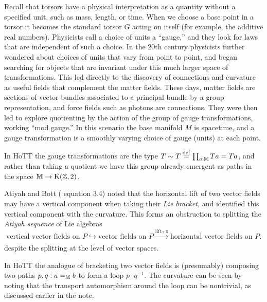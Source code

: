 \begin{mynote}
Recall that torsors have a physical interpretation as a quantity without a specified unit, such as mass, length, or time. When we choose a base point in a torsor it becomes the standard torsor \( G \) acting on itself (for example, the additive real numbers). Physicists call a choice of units a ``gauge,'' and they look for laws that are independent of such a choice. In the 20th century physicists further wondered about choices of units that vary from point to point, and began searching for objects that are invariant under this much larger space of transformations. This led directly to the discovery of connections and curvature as useful fields that complement the matter fields. These days, matter fields are sections of vector bundles associated to a principal bundle by a group representation, and force fields such as photons are connections. They were then led to explore quotienting by the action of the group of gauge transformations, working ``mod gauge.'' In this scenario the base manifold \( M \) is spacetime, and a gauge transformation is a smoothly varying choice of gauge (units) at each point.
\end{mynote}

In HoTT the gauge transformations are the type \( T\sim T\stackrel{\mathrm{def}}{=} \prod_{a:\mathbb{M}}Ta=Ta \), and rather than taking a quotient we have this group already emergent as paths in the space \( \mathbb{M}\to\mathrm{K}(\mathbb{Z},2) \). 

Atiyah and Bott (\cite{atiyah1983yang} equation 3.4) noted that the horizontal lift of two vector fields may have a vertical component when taking their \emph{Lie bracket}, and identified this vertical component with the curvature. This forms an obstruction to splitting the \emph{Atiyah sequence} of Lie algebras
\[ 
\text{vertical vector fields on }P \hookrightarrow \text{vector fields on }P \xrightarrow[]{\mathrm{lift}\circ\pi} \text{horizontal vector fields on }P.
\]
despite the splitting at the level of vector spaces.

In HoTT the analogue of bracketing two vector fields is (presumably) composing two paths \( p,q:a=_{\mathbb{M}} b \) to form a loop \( p\cdot q^{-1} \). The curvature can be seen by noting that the transport automorphism around the loop can be nontrivial, as discussed earlier in the note.

